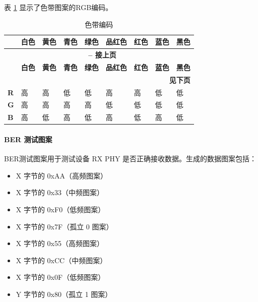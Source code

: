 \documentclass[main\_\_CN.tex]{subfiles}
\begin{document}
表 \ref{tab:color-bar-coding} 显示了色带图案的RGB编码。
\begin{longtable}[c]{ |p{0.5cm}|p{1.5cm}|p{1.5cm}|p{1.5cm}|p{1.5cm}|p{1.5cm}|p{1.5cm}|p{1.5cm}|p{1.5cm}| }
    \caption{色带编码}
    \label{tab:color-bar-coding}\\\hline

    \rowcolor{lightgray}
     & \textbf{白色} & \textbf{黄色} & \textbf{青色} & \textbf{绿色} & \textbf{品红色} & \textbf{红色} & \textbf{蓝色} & \textbf{黑色}  \\\hline
    \endfirsthead


    \multicolumn{9}{c}{\bfseries \tablename\ \thetable{} -- 接上页}\\\hline
    \rowcolor{lightgray}
    & \textbf{白色} & \textbf{黄色} & \textbf{青色} & \textbf{绿色} & \textbf{品红色} & \textbf{红色} & \textbf{蓝色} & \textbf{黑色}  \\\hline
    \endhead

    \multicolumn{9}{r}{\textbf{见下页}} \\
    \endfoot

    \endlastfoot
        
        \textbf{R} & 高 & 高 & 低  & 低  & 高 & 高 & 低  & 低 \\\hline
        \textbf{G} & 高 & 高 & 高 & 高 & 低  & 低  & 低  & 低 \\\hline
        \textbf{B} & 高 & 低  & 高 & 低  & 高 & 低  & 高 & 低 \\\hline

\end{longtable}

\paragraph{BER 测试图案}
BER测试图案用于测试设备 RX PHY 是否正确接收数据。生成的数据图案包括：
\begin{itemize}
    \item X 字节的 0xAA（高频图案）
    \item X 字节的 0x33（中频图案）
    \item X 字节的 0xF0（低频图案）
    \item X 字节的 0x7F（孤立 0 图案）
    \item X 字节的 0x55（高频图案）
    \item X 字节的 0xCC（中频图案）
    \item X 字节的 0x0F（低频图案）
    \item Y 字节的 0x80（孤立 1 图案）
\end{itemize}
\end{document}
